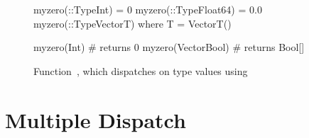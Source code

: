 \begin{figure}[t]
\centering
\begin{minipage}{8cm}
\begin{julia}
myzero(::Type{Int})               = 0
myzero(::Type{Float64})           = 0.0
myzero(::Type{Vector{T}}) where T = Vector{T}()

myzero(Int)           # returns 0
myzero(Vector{Bool})  # returns Bool[]
\end{julia}
\end{minipage}
\caption{Function~, which dispatches on type values
using }\label{fig:code:dispatch-on-type}
\end{figure}

\section{Multiple Dispatch}\label{sec:background:dispatch}

